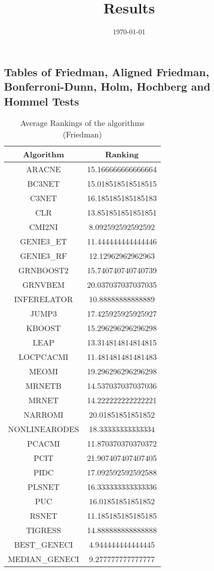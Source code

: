 \documentclass[a4paper,10pt]{article}
\title{Results}
\author{}
\date{\today}
\begin{document}
\begin{landscape}
\oddsidemargin 0in \topmargin 0in\maketitle
\section{Tables of Friedman, Aligned Friedman, Bonferroni-Dunn, Holm, Hochberg and Hommel Tests}
\begin{table}[!htp]
\centering
\caption{Average Rankings of the algorithms (Friedman)
}\begin{tabular}{c|c}
Algorithm&Ranking\\
\hline
ARACNE&15.166666666666664\\
BC3NET&15.018518518518515\\
C3NET&16.185185185185183\\
CLR&13.851851851851851\\
CMI2NI&8.092592592592592\\
GENIE3_ET&11.444444444444446\\
GENIE3_RF&12.12962962962963\\
GRNBOOST2&15.740740740740739\\
GRNVBEM&20.037037037037035\\
INFERELATOR&10.88888888888889\\
JUMP3&17.425925925925927\\
KBOOST&15.296296296296298\\
LEAP&13.314814814814815\\
LOCPCACMI&11.481481481481483\\
MEOMI&19.296296296296298\\
MRNETB&14.537037037037036\\
MRNET&14.222222222222221\\
NARROMI&20.01851851851852\\
NONLINEARODES&18.33333333333334\\
PCACMI&11.870370370370372\\
PCIT&21.907407407407405\\
PIDC&17.092592592592588\\
PLSNET&16.333333333333336\\
PUC&16.01851851851852\\
RSNET&11.185185185185185\\
TIGRESS&14.888888888888888\\
BEST_GENECI&4.944444444444445\\
MEDIAN_GENECI&9.277777777777777\\
\end{tabular}
\end{table}



\end{landscape}
\end{document}
